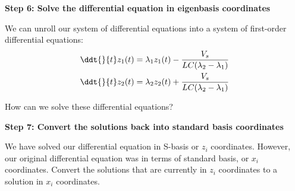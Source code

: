 \qitem \textbf{Step 6: Solve the differential equation in eigenbasis coordinates}

We can unroll our system of differential equations into a system of first-order differential equations:
  \begin{gather*}
    \ddt{}{t} z_{1}(t) = \lambda_1 z_{1}(t) - \frac{V_s}{LC(\lambda_{2} - \lambda_{1})} \\
    \ddt{}{t} z_{2}(t) = \lambda_2 z_{2}(t) + \frac{V_s}{LC(\lambda_{2} - \lambda_{1})}
  \end{gather*}

How can we solve these differential equations?


\qitem \textbf{Step 7: Convert the solutions back into standard basis coordinates}

We have solved our differential equation in S-basis or $z_i$ coordinates.
However, our original differential equation was in terms of standard basis, or $x_i$ coordinates.
Convert the solutions that are currently in $z_i$ coordinates to a solution in $x_i$ coordinates.


